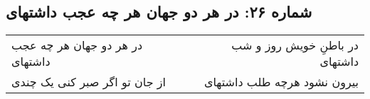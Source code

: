 \begin{center}
\section*{شماره ۲۶: در هر دو جهان هر چه عجب داشتهای}
\label{sec:026}
\begin{longtable}{l p{0.5cm} r}
در هر دو جهان هر چه عجب داشتهای
&&
در باطنِ خویش روز و شب داشتهای
\\
از جان تو اگر صبر کنی یک چندی
&&
بیرون نشود هرچه طلب داشتهای
\\
\end{longtable}
\end{center}
